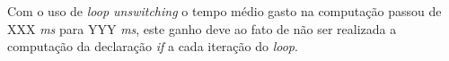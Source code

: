 Com o uso de \textit{loop unswitching} o tempo médio gasto na computação passou
de XXX \textit{ms} para YYY \textit{ms}, este ganho deve ao fato de não ser
realizada a computação da declaração \textit{if} a cada iteração do
\textit{loop}.




%


